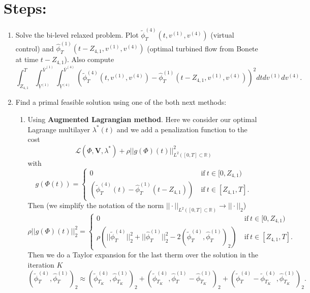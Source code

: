 \documentclass[12pt]{article}
\theoremstyle{definition}
\theoremstyle{remark}
\newcommand{\R}{\mathbb{R}}
\begin{document}
\section{Steps:}

\begin{enumerate}

\item Solve the bi-level relaxed problem. Plot $\tilde{\phi}^{(4)}_T(t,v^{(1)},v^{(4)})$ (virtual control) and $\hat{\phi}^{(1)}_T(t-Z_{4,1},v^{(1)},v^{(4)})$ (optimal turbined flow from Bonete at time $t-Z_{4,1}$). Also compute
\begin{equation*}
\int_{Z_{4,1}}^T\int_{\underline{V}^{(1)}}^{\overline{V}^{(1)}}\int_{\underline{V}^{(4)}}^{\overline{V}^{(4)}}\left(\tilde{\phi}^{(4)}_T(t,v^{(1)},v^{(4)})-\hat{\phi}^{(1)}_T(t-Z_{4,1},v^{(1)},v^{(4)})\right)^2dtdv^{(1)}dv^{(4)}.
\end{equation*}

\item Find a primal feasible solution using one of the both next methods:

\begin{enumerate}
\item Using \textbf{Augmented Lagrangian method}. Here we consider our optimal Lagrange multilayer $\lambda^*(t)$ and we add a penalization function to the cost
\begin{equation*}
\mathcal{L}(\Phi,\bm{V},\lambda^*)+\rho||g(\Phi)(t)||^2_{L^2([0,T]\subset\R)}
\end{equation*}
with
\begin{equation*}
g(\Phi(t))=\begin{cases}
0\ &\text{if}\ t\in[0,Z_{4,1})\\
\left(\tilde{\phi}^{(4)}_T(t)-\hat{\phi}^{(1)}_T(t-Z_{4,1})\right)\ &\text{if}\ t\in[Z_{4,1},T].
\end{cases}
\end{equation*}
Then (we simplify the notation of the norm $||\cdot||_{L^2([0,T]\subset\R)}\to||\cdot||_2$)
\begin{equation*}
\rho||g(\Phi)(t)||^2_2=\begin{cases}
0\ &\text{if}\ t\in[0,Z_{4,1})\\
\rho\left(||\tilde{\phi}^{(4)}_T||^2_2+||\hat{\phi}^{(1)}_T||^2_2-2\left(\tilde{\phi}^{(4)}_T,\hat{\phi}^{(1)}_T\right)_2\right)\ &\text{if}\ t\in[Z_{4,1},T].
\end{cases}
\end{equation*}
Then we do a Taylor expansion for the last therm over the solution in the iteration $K$
\begin{equation*}
\left(\tilde{\phi}^{(4)}_T,\hat{\phi}^{(1)}_T\right)_2\approx\left(\tilde{\phi}^{(4)}_{T_K},\hat{\phi}^{(1)}_{T_K}\right)_2+\left(\tilde{\phi}^{(4)}_{T_K},\hat{\phi}^{(1)}_T-\hat{\phi}^{(1)}_{T_K}\right)_2+\left(\tilde{\phi}^{(4)}_T-\tilde{\phi}^{(4)}_{T_K},\hat{\phi}^{(1)}_{T_K}\right)_2.
\end{equation*}


\end{enumerate}
\end{enumerate}
\end{document}
